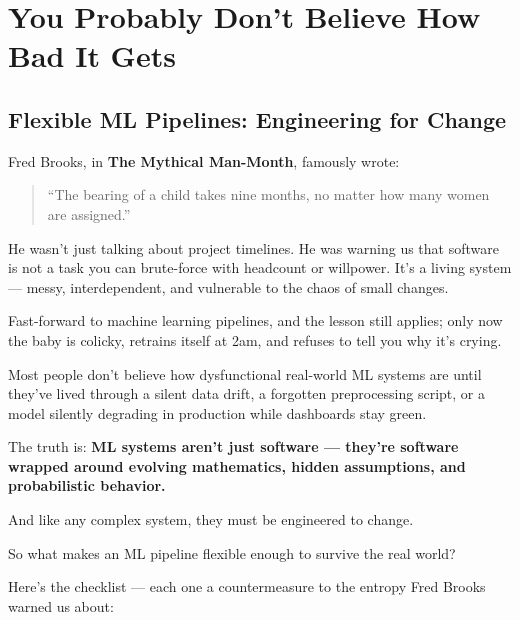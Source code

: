 \section{You Probably Don’t Believe How Bad It Gets}

\subsection{Flexible ML Pipelines: Engineering for Change}

Fred Brooks, in \textbf{The Mythical Man-Month}, famously wrote:

\begin{quote}
    “The bearing of a child takes nine months, no matter how many women are assigned.”
\end{quote}

He wasn’t just talking about project timelines.  He was warning us that software is not a task you can brute-force with headcount or willpower. It’s a living system --- messy, interdependent, and vulnerable to the chaos of small changes.

Fast-forward to machine learning pipelines, and the lesson still applies; only now the baby is colicky, retrains itself at 2am, and refuses to tell you why it’s crying.

Most people don’t believe how dysfunctional real-world ML systems are until they’ve lived through a silent data drift, a forgotten preprocessing script, or a model silently degrading in production while dashboards stay green.

The truth is:  \textbf{ML systems aren’t just software — they’re software wrapped around evolving mathematics, hidden assumptions, and probabilistic behavior.}

And like any complex system, they must be engineered to change.

So what makes an ML pipeline flexible enough to survive the real world?

Here’s the checklist — each one a countermeasure to the entropy Fred Brooks warned us about:


